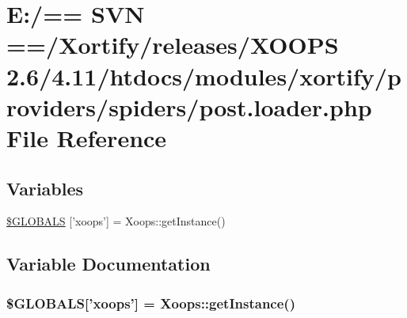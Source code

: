 \hypertarget{spiders_2post_8loader_8php}{\section{E\-:/== S\-V\-N ==/\-Xortify/releases/\-X\-O\-O\-P\-S 2.6/4.11/htdocs/modules/xortify/providers/spiders/post.loader.\-php File Reference}
\label{spiders_2post_8loader_8php}
}
\subsection*{Variables}
\begin{DoxyCompactItemize}
\item 
\hyperlink{spiders_2post_8loader_8php_ad10934112c0d18cf6b358d47afa6fcf1}{\$\-G\-L\-O\-B\-A\-L\-S} \mbox{[}'xoops'\mbox{]} = Xoops\-::get\-Instance()
\end{DoxyCompactItemize}


\subsection{Variable Documentation}
\hypertarget{spiders_2post_8loader_8php_ad10934112c0d18cf6b358d47afa6fcf1}{
\subsubsection[{\$\-G\-L\-O\-B\-A\-L\-S}]{\setlength{\rightskip}{0pt plus 5cm}\$G\-L\-O\-B\-A\-L\-S\mbox{[}'xoops'\mbox{]} = Xoops\-::get\-Instance()}}\label{spiders_2post_8loader_8php_ad10934112c0d18cf6b358d47afa6fcf1}

